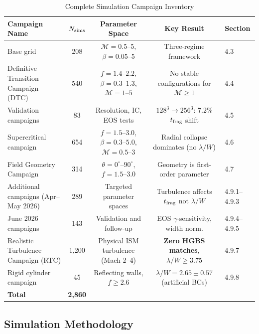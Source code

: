 \documentclass[twocolumn]{mnras}
\begin{document}
\begin{table}
\caption{Complete Simulation Campaign Inventory}
\label{tab:campaign_inventory}
\small
\begin{tabular}{lcccl}
\toprule
Campaign Name & $N_{\rm sims}$ & Parameter Space & Key Result & Section \\
\midrule
Base grid & 208 & $\mathcal{M}=0.5\mbox{--}5$, $\beta=0.05\mbox{--}5$ & Three-regime framework & 4.3 \\
Definitive Transition Campaign (DTC) & 540 & $f=1.4\mbox{--}2.2$, $\beta=0.3\mbox{--}1.3$, $\mathcal{M}=1\mbox{--}5$ & No stable configurations for $\mathcal{M}\geq1$ & 4.4 \\
Validation campaigns & 83 & Resolution, IC, EOS tests & $128^3\to256^3$: 7.2\% $t_{\rm frag}$ shift & 4.5 \\
Supercritical campaign & 654 & $f=1.5\mbox{--}3.0$, $\beta=0.3\mbox{--}5.0$, $\mathcal{M}=0.5\mbox{--}3$ & Radial collapse dominates (no $\lambda/W$) & 4.6 \\
Field Geometry Campaign & 314 & $\theta=0^{\circ}\mbox{--}90^{\circ}$, $f=1.5\mbox{--}3.0$ & Geometry is first-order parameter & 4.7 \\
Additional campaigns (Apr--May 2026) & 289 & Targeted parameter spaces & Turbulence affects $t_{\rm frag}$ not $\lambda/W$ & 4.9.1--4.9.3 \\
June 2026 campaigns & 143 & Validation and follow-up & EOS $\gamma$-sensitivity, width norm. & 4.9.4--4.9.5 \\
Realistic Turbulence Campaign (RTC) & 1,200 & Physical ISM turbulence (Mach 2--4) & \textbf{Zero HGBS matches}, $\lambda/W\geq3.75$ & 4.9.7 \\
Rigid cylinder campaign & 45 & Reflecting walls, $f\geq2.6$ & $\lambda/W=2.65\pm0.57$ (artificial BCs) & 4.9.8 \\
\midrule
\textbf{Total} & \textbf{2,860} &  &  &  \\
\bottomrule
\end{tabular}
\end{table}

\subsection{Simulation Methodology}
\end{document}
